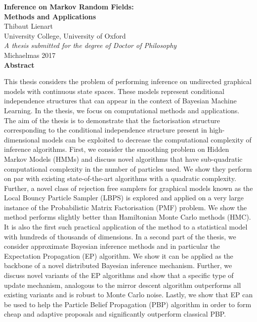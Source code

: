 
\begin{center}
{\Large\bfseries Inference on Markov Random Fields:\\[.2cm]
Methods and Applications}\\[1cm]
{\large Thibaut Lienart}\\[.3cm]
University College, University of Oxford\\[1cm]
\emph{A thesis submitted for the degree of Doctor of Philosophy}\\[.3cm]
Michaelmas 2017\\[1.5cm]

{\large\bfseries Abstract}
\begin{flushleft}
This thesis considers the problem of performing inference on undirected graphical models with continuous state spaces. 
These models represent conditional independence structures that can appear in the context of Bayesian Machine Learning. 
In the thesis, we focus on computational methods and applications. 
The aim of the thesis is to demonstrate that the factorisation structure corresponding to the conditional independence structure present in high-dimensional models can be exploited to decrease the computational complexity of inference algorithms.
First, we consider the smoothing problem on Hidden Markov Models (HMMs) and discuss novel algorithms that have sub-quadratic computational complexity in the number of particles used. 
We show they perform on par with existing state-of-the-art algorithms with a quadratic complexity. 
Further, a novel class of rejection free samplers for graphical models known as the Local Bouncy Particle Sampler (LBPS) is explored and applied on a very large instance of the Probabilistic Matrix Factorisation (PMF) problem. 
We show the method performs slightly better than Hamiltonian Monte Carlo methods (HMC). 
It is also the first such practical application of the method to a statistical model with hundreds of thousands of dimensions. 
In a second part of the thesis, we consider approximate Bayesian inference methods and in particular the Expectation Propagation (EP) algorithm. 
We show it can be applied as the backbone of a novel distributed Bayesian inference mechanism. 
Further, we discuss novel variants of the EP algorithms and show that a specific type of update mechanism, analogous to the mirror descent algorithm outperforms all existing variants and is robust to Monte Carlo noise. 
Lastly, we show that EP can be used to help the Particle Belief Propagation (PBP) algorithm in order to form cheap and adaptive proposals and significantly outperform classical PBP. 
\end{flushleft}
\end{center}
